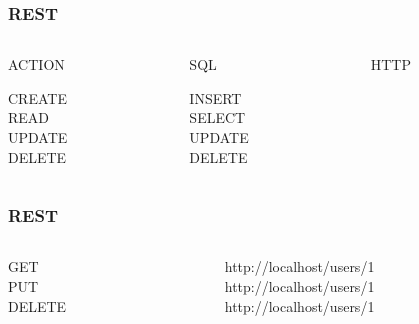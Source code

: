 \begin{frame}
  \frametitle{REST}
  \begin{columns}
    \begin{column}{2cm}
      \begin{center}ACTION\end{center}
      CREATE\\
      READ\\
      UPDATE\\
      DELETE
    \end{column}    
    \begin{column}{2cm}
      \begin{center}SQL\end{center}
      INSERT\\
      SELECT\\
      UPDATE\\
      DELETE
    \end{column}
    \begin{column}{2cm}   
      \begin{center}HTTP\end{center}
      \\
      \\
      \\
    \end{column}
  \end{columns}
\end{frame}


\begin{frame}
  \frametitle{REST}
  \begin{columns}
    \begin{column}{.3\textwidth}
      \begin{flushright}
      GET\\
      PUT\\
      DELETE
      \end{flushright}
    \end{column}    
    \begin{column}{.7\textwidth}
      \begin{flushleft}
      http://localhost/users/1\\
      http://localhost/users/1\\
      http://localhost/users/1\\
      \end{flushleft}
    \end{column}    
    \end{columns}
\end{frame}

